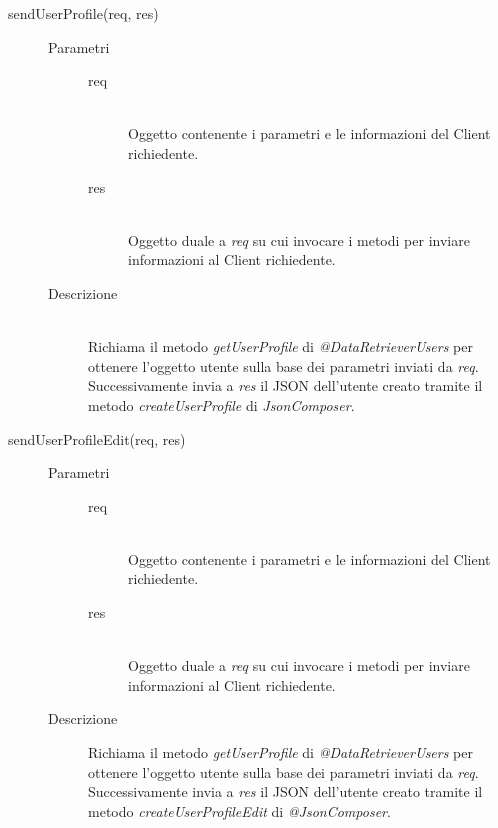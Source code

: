 \begin{description}
\begin{description}
    \item[sendUserProfile(req, res)] \hfill
      \begin{description}
	\item[Parametri] \hfill
	  \begin{description}
	    \item[req] \hfill \\
	    Oggetto contenente i parametri e le informazioni del Client richiedente.
	    \item[res] \hfill \\
	    Oggetto duale a \textit{req} su cui invocare i metodi per inviare informazioni al Client richiedente.
	  \end{description}
	\item[Descrizione] \hfill \\
	Richiama il metodo \textit{getUserProfile} di \textit{@DataRetrieverUsers} per ottenere l'oggetto utente 
	sulla base dei parametri inviati da \textit{req}. Successivamente invia a \textit{res} il JSON dell'utente 	creato tramite il metodo \textit{createUserProfile} di \textit{JsonComposer}.
      \end{description}
      
    \item[sendUserProfileEdit(req, res)] \hfill
      \begin{description}
	\item[Parametri] \hfill
	  \begin{description}
	    \item[req] \hfill \\
	    Oggetto contenente i parametri e le informazioni del Client richiedente.
	    \item[res] \hfill \\
	    Oggetto duale a \textit{req} su cui invocare i metodi per inviare informazioni al Client richiedente.
	  \end{description}
	\item[Descrizione]
	Richiama il metodo \textit{getUserProfile} di \textit{@DataRetrieverUsers} per ottenere l'oggetto utente 
	sulla base dei parametri inviati da \textit{req}. Successivamente invia a \textit{res} il JSON dell'utente 	creato tramite il metodo \textit{createUserProfileEdit} di \textit{@JsonComposer}.
      \end{description}
      

\end{description}
\end{description}
